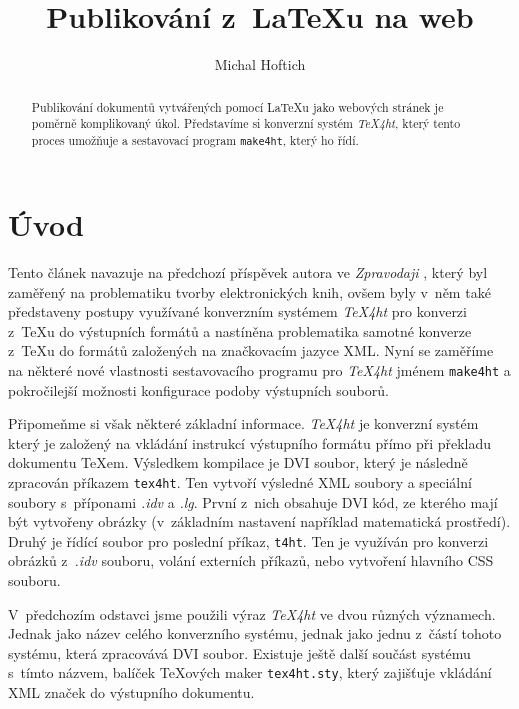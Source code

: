 \documentclass{csbulletin}
\newcommand\nazev[1]{\textit{#1}}
\newcommand\prikaz[1]{\texttt{#1}}
\begin{document}
\title{Publikování z~\LaTeX u na web}
\author{Michal Hoftich}
\maketitle

\begin{abstract}
Publikování dokumentů vytvářených pomocí \LaTeX u jako webových stránek je
poměrně komplikovaný úkol. Představíme si konverzní systém \nazev{TeX4ht}, který
tento proces umožňuje a sestavovací program \prikaz{make4ht}, který ho řídí.
\end{abstract}

\section{Úvod}



Tento článek navazuje na předchozí příspěvek autora ve \nazev{Zpravodaji}
\parencite{hoftich:16}, který byl zaměřený na problematiku tvorby
elektronických knih, ovšem byly v~něm také
představeny postupy využívané konverzním systémem \nazev{TeX4ht} pro konverzi
z~\TeX u do výstupních formátů a nastíněna problematika samotné konverze z~\TeX u
do formátů založených na značkovacím jazyce XML. 
Nyní se zaměříme na některé nové vlastnosti sestavovacího programu pro \nazev{TeX4ht} jménem
\prikaz{make4ht} a pokročilejší možnosti konfigurace podoby výstupních souborů.

Připomeňme si však některé základní informace. \nazev{TeX4ht} je konverzní
systém který je založený na vkládání instrukcí výstupního formátu přímo při
překladu dokumentu \TeX em. Výsledkem kompilace je DVI soubor, který je
následně zpracován příkazem \prikaz{tex4ht}. Ten vytvoří výsledné XML soubory a
speciální soubory s~příponami \nazev{.idv} a \nazev{.lg}.
První z~nich obsahuje DVI kód, ze kterého mají být vytvořeny obrázky
(v~základním nastavení například matematická prostředí). Druhý je řídící soubor
pro poslední příkaz, \prikaz{t4ht}. Ten je využíván pro konverzi obrázků
z~\nazev{.idv} souboru, volání externích příkazů, nebo vytvoření hlavního CSS
souboru.

V~předchozím odstavci jsme použili výraz \nazev{TeX4ht} ve dvou různých
významech. Jednak jako název celého konverzního systému, jednak jako jednu
z~částí tohoto systému, která zpracovává DVI soubor. Existuje ještě další součást
systému s~tímto názvem, balíček \TeX ových maker \prikaz{tex4ht.sty}, který
zajišťuje vkládání XML značek do výstupního dokumentu.
\end{document}
